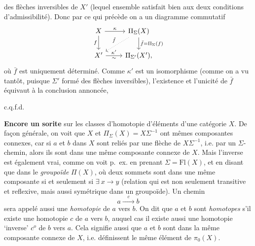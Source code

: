 \setcounter{footnote}{20}

des flèches inversibles de $X'$ (lequel ensemble satisfait bien aux deux conditions d'admissibilité). Donc par ce qui précède on a un diagramme commutatif
\[
\begin{tikzcd}
X \ar[r,"\kappa"] \ar[d,"f"'] & \Pi_{\Sigma}(X) \ar[d,"\bar f = \Pi_{\Sigma}(f)"] \ar[dl,dotted,"\tilde f"'] \\
X' \ar[r,"\kappa'","\sim"'] & \Pi_{\Sigma'}(X'),
\end{tikzcd}
\]
où $\bar f$ est uniquement déterminé. Comme $\kappa'$ est un isomorphisme (comme on a vu tantôt, puisque $\Sigma'$ formé des flèches inversibles), l'existence et l'unicité de $\bar f$ équivaut à la conclusion annoncée,

\hfill c.q.f.d.

\textbf{Encore un sorite} sur les classes d'homotopie d'éléments d'une catégorie $X$. De façon générale, on voit que $X$ et $\Pi_{\Sigma}(X) = X\Sigma^{-1}$ ont mêmes composantes connexes, car si
$a$ et $b$ dans $X$ sont reliés par une flèche de $X\Sigma^{-1}$, i.e. par un $\Sigma$-chemin, alors ils sont dans une même composante connexe de $X$. Mais l'inverse est également vrai, comme on voit p.~ex. en prenant $\Sigma = \mathrm{Fl}(X)$, et en disant que dans le \textit{groupoïde} $\Pi(X)$, où deux sommets sont dans une même composante si et seulement si $\exists\ x \longrightarrow y$ (relation qui est non seulement transitive et reflexive, mais aussi symétrique dans un groupoïde). Un chemin
\[
a \xrightarrow{\quad c \quad} b
\]
sera appelé aussi une \textit{homotopie} de $a$ vers $b$. On dit que $a$ et $b$ sont \textit{homotopes} s'il existe une homotopie $c$ de $a$ vers $b$, auquel cas il existe aussi une homotopie `inverse' $c^{o}$ de $b$ vers $a$. Cela signifie aussi que $a$ et $b$ sont dans la même composante connexe de $X$, i.e. définissent le même élément de $\pi_0(X)$.

